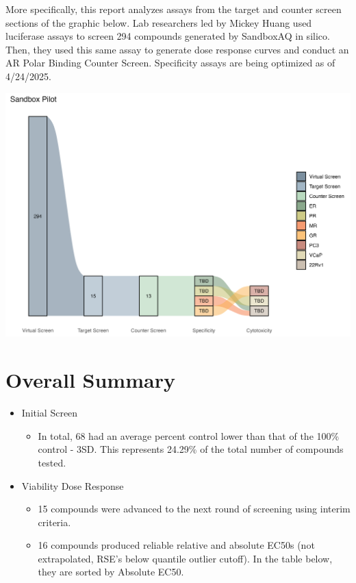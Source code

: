 \documentclass[
]{article}
\providecommand{\tightlist}{%
  \setlength{\itemsep}{0pt}\setlength{\parskip}{0pt}}
\begin{document}
\newpage

More specifically, this report analyzes assays from the target and
counter screen sections of the graphic below. Lab researchers led by
Mickey Huang used luciferase assays to screen 294 compounds generated by
SandboxAQ in silico. Then, they used this same assay to generate dose
response curves and conduct an AR Polar Binding Counter Screen.
Specificity assays are being optimized as of 4/24/2025.

\begin{center}\includegraphics[width=1\linewidth]{../images/pilot_sankey} \end{center}

\newpage

\section{Overall Summary}\label{overall-summary}

\begin{itemize}
\tightlist
\item
  Initial Screen

  \begin{itemize}
  \tightlist
  \item
    In total, 68 had an average percent control lower than that of the
    100\% control - 3SD. This represents 24.29\% of the total number of
    compounds tested.
  \end{itemize}
\item
  Viability Dose Response

  \begin{itemize}
  \tightlist
  \item
    15 compounds were advanced to the next round of screening using
    interim criteria.
  \item
    16 compounds produced reliable relative and absolute EC50s (not
    extrapolated, RSE's below quantile outlier cutoff). In the table
    below, they are sorted by Absolute EC50.
  \end{itemize}
\end{itemize}
\end{document}
